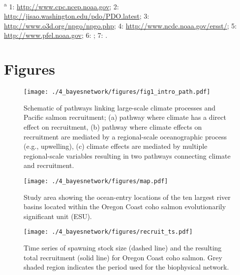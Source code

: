 

\noindent \textsuperscript{a} 1: \url{http://www.cpc.ncep.noaa.gov}; 
  2: \url{http://jisao.washington.edu/pdo/PDO.latest}; 3:
  \url{http://www.o3d.org/npgo/npgo.php}; 4:
  \url{http://www.ncdc.noaa.gov/ersst/}; 5: \url{http://www.pfel.noaa.gov}; 6:
  \citet{Peterson2012a}; 7: \citet{PFMC2013}.

\newpage





\newpage



\section{Figures}

\begin{figure}[htbp]
  \centering \texttt{[image: ./4\_bayesnetwork/figures/fig1\_intro\_path.pdf]}
  \caption[Schematic of pathways linking large-scale climate processes and
    Pacific salmon recruitment.]{Schematic of pathways linking large-scale
    climate processes and Pacific salmon recruitment; (a) pathway where
    climate has a direct effect on recruitment, (b) pathway where climate
    effects on recruitment are mediated by a regional-scale oceanographic
    process (e.g., upwelling), (c) climate effects are mediated by multiple
    regional-scale variables resulting in two pathways connecting climate and
    recruitment.}
  \label{fig:bn:1}
\end{figure}

\begin{figure}[htbp]
  \centering \texttt{[image: ./4\_bayesnetwork/figures/map.pdf]}
  \caption[Study area showing the ocean-entry locations of the ten largest river
    basins in the Oregon Coast ESU.]{Study area showing the ocean-entry
    locations of the ten largest river basins located within the Oregon Coast
    coho salmon evolutionarily significant unit (ESU).}
  \label{fig:bn:2}
\end{figure}

\begin{figure}[htbp]
  \centering \texttt{[image: ./4\_bayesnetwork/figures/recruit\_ts.pdf]}
  \caption[Time series of spawning stock size and the resulting
    total recruitment.]{Time series of spawning stock size (dashed line) and the
    resulting total recruitment (solid line) for Oregon Coast coho salmon.
    Grey shaded region indicates the period used for the biophysical network.}
  \label{fig:bn:3}
\end{figure}

